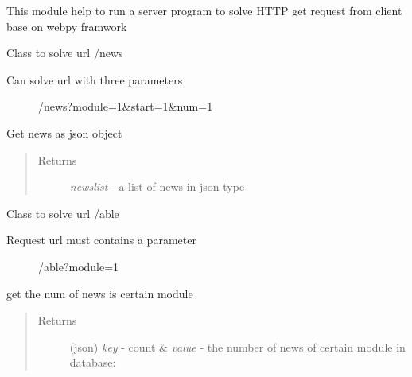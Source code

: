 \documentclass[letterpaper,10pt,english]{sphinxmanual}
\begin{document}
This module help to run a server program to solve HTTP get request from client base on webpy framwork

\begin{fulllineitems}
\label{sysunews:sysunews.server.Getnews}
Class to solve url /news
\begin{description}
\item[{Can solve url with three parameters}] \leavevmode
/news?module=1\&start=1\&num=1

\end{description}

\begin{fulllineitems}
\label{sysunews:sysunews.server.Getnews.GET}
Get news as json object
\begin{quote}\begin{description}
\item[{Returns}] \leavevmode
\emph{newslist} - a list of news in json type

\end{description}\end{quote}

\end{fulllineitems}


\end{fulllineitems}


\begin{fulllineitems}
\label{sysunews:sysunews.server.GetnewsNum}
Class to solve url /able
\begin{description}
\item[{Request url must contains a parameter}] \leavevmode
/able?module=1

\end{description}

\begin{fulllineitems}
\label{sysunews:sysunews.server.GetnewsNum.GET}
get the num of news is certain module
\begin{quote}\begin{description}
\item[{Returns}] \leavevmode
(json) \emph{key} - count \& \emph{value} - the number of news of certain module in database:

\end{description}\end{quote}

\end{fulllineitems}


\end{fulllineitems}
\end{document}
